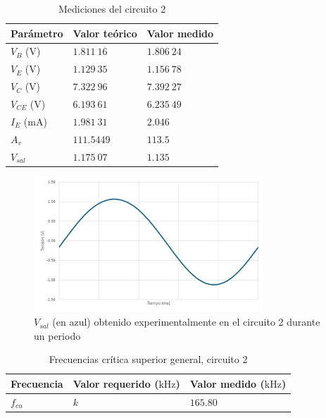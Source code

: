 \documentclass[journal]{IEEEtran}
\begin{document}
\begin{table}[H]
        \renewcommand{\arraystretch}{1.5}
        \caption{Mediciones del circuito 2}
        \centering
        \begin{tabular}{ >{\centering\arraybackslash}m{2.5cm} >{\centering\arraybackslash}m{2.5cm} >{\centering\arraybackslash}m{2.5cm} }
                \hline
            Parámetro & Valor teórico & Valor medido\\ 
            \hline
            $V_B$ ($\mathrm{V}$) & $1.811~16$  & $1.806~24$  \\ 
            $V_E$ ($\mathrm{V}$) & $1.129~35$  & $1.156~78$  \\
            $V_C$ ($\mathrm{V}$) & $7.322~96$  & $7.392~27$  \\
            $V_{CE}$ ($\mathrm{V}$) & $6.193~61$  & $6.235~49$  \\
            $I_E$ ($\mathrm{mA}$) & $1.981~31$  & $2.046$ \\ 
            $A_v$  & $111.5449$ & $113.5$  \\
            $V_{sal}$ & $1.175~07$  & $1.135$ \\
            \hline
        \end{tabular}
        \label{tabla6}
    \end{table}

\begin{figure}[H]
        \centering
        \includegraphics[width=3.4in]{OutC2.png}
        \caption{$V_{sal}$ (en azul) obtenido experimentalmente en el circuito 2 durante un periodo}
        \label{fig:SignalExperimental_02}
\end{figure}

\begin{table}[H]
        \centering
        \renewcommand{\arraystretch}{1.5}
        \caption{Frecuencias crítica superior general, circuito 2}
        \begin{tabular}{ >{\centering\arraybackslash}m{2.5cm} >{\centering\arraybackslash}m{2.5cm} >{\centering\arraybackslash}m{2.5cm} }
                \hline
            Frecuencia & Valor requerido ($\mathrm{kHz}$) & Valor medido ($\mathrm{kHz}$)\\ 
            \hline
            \centering
            $f_{cu}$ & $k$  & $165.80$  \\ 
            \hline
        \end{tabular}
        \label{tabla7}
    \end{table}   
\end{document}
